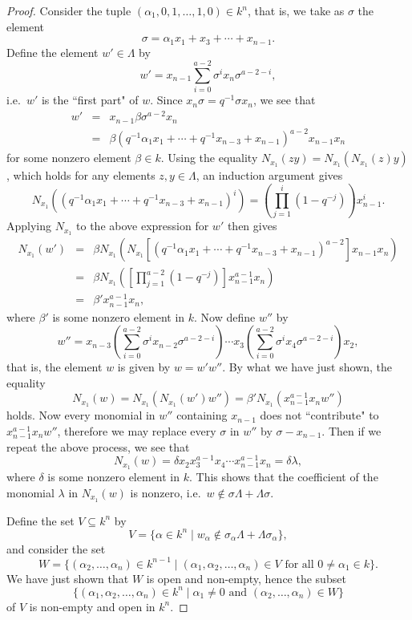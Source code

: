 \documentclass[a4paper]{amsart}
\theoremstyle{definition}
\theoremstyle{definition}
\theoremstyle{definition}
\theoremstyle{definition}
\theoremstyle{definition}
\theoremstyle{definition}
\theoremstyle{remark}
\theoremstyle{remark}
\theoremstyle{definition}
\theoremstyle{definition}
\begin{document}
\begin{proof}
Consider the tuple $( \alpha_1,0,1, \dots, 1,0) \in k^n$, that is,
we take as $\sigma$ the element
$$\sigma = \alpha_1x_1 + x_3 + \cdots + x_{n-1}.$$
Define the element $w' \in \Lambda$ by
$$w' = x_{n-1} \sum_{i=0}^{a-2} \sigma^i x_n \sigma^{a-2-i},$$
i.e.\ $w'$ is the ``first part" of $w$. Since $x_n \sigma = q^{-1}
\sigma x_n$, we see that
\begin{eqnarray*}
w' & = & x_{n-1} \beta \sigma^{a-2} x_n \\
& = & \beta ( q^{-1} \alpha_1x_1 + \cdots + q^{-1}x_{n-3} + x_{n-1}
)^{a-2}x_{n-1}x_n
\end{eqnarray*}
for some nonzero element $\beta \in k$. Using the equality
$N_{x_1}(zy) = N_{x_1} \left ( N_{x_1}(z)y \right )$, which holds
for any elements $z,y \in \Lambda$, an induction argument gives
$$N_{x_1} \left ( ( q^{-1} \alpha_1x_1 + \cdots + q^{-1}x_{n-3} + x_{n-1}
)^i \right ) = \left ( \prod_{j=1}^i (1-q^{-j}) \right )
x_{n-1}^i.$$ Applying $N_{x_1}$ to the above expression for $w'$
then gives
\begin{eqnarray*}
N_{x_1}( w' ) &=& \beta N_{x_1} \left ( N_{x_1} \left [ ( q^{-1}
\alpha_1x_1 + \cdots + q^{-1}x_{n-3} + x_{n-1} )^{a-2} \right ]
x_{n-1}x_n
\right ) \\
&=& \beta N_{x_1} \left ( \left [ \prod_{j=1}^{a-2} (1-q^{-j})
\right ] x_{n-1}^{a-1}x_n \right ) \\
&=& \beta' x_{n-1}^{a-1}x_n,
\end{eqnarray*}
where $\beta'$ is some nonzero element in $k$. Now define $w''$ by
$$w'' =x_{n-3} \left ( \sum_{i=0}^{a-2} \sigma^i x_{n-2}
\sigma^{a-2-i} \right ) \cdots x_3 \left ( \sum_{i=0}^{a-2} \sigma^i
x_4 \sigma^{a-2-i} \right ) x_2,$$ that is, the element $w$ is given
by $w=w'w''$. By what we have just shown, the equality
$$N_{x_1}(w) = N_{x_1} \left ( N_{x_1} (w')w'' \right )  = \beta' N_{x_1}
(x_{n-1}^{a-1}x_nw'')$$ holds. Now every monomial in $w''$
containing $x_{n-1}$ does not ``contribute" to
$x_{n-1}^{a-1}x_nw''$, therefore we may replace every $\sigma$ in
$w''$ by $\sigma - x_{n-1}$. Then if we repeat the above process, we
see that
$$N_{x_1}(w) = \delta x_2x_3^{a-1}x_4 \cdots
x_{n-1}^{a-1}x_n = \delta \lambda,$$ where $\delta$ is some nonzero
element in $k$. This shows that the coefficient of the monomial
$\lambda$ in $N_{x_1}(w)$ is nonzero, i.e.\ $w \notin \sigma \Lambda
+ \Lambda \sigma$.

Define the set $V \subseteq k^n$ by
$$V = \{ \alpha \in k^n \mid w_{\alpha} \notin \sigma_{\alpha}
\Lambda + \Lambda \sigma_{\alpha} \},$$ and consider the set
$$W = \{ ( \alpha_2, \dots, \alpha_n ) \in k^{n-1} \mid ( \alpha_1, \alpha_2,
\dots, \alpha_n) \in V \text{ for all } 0 \neq \alpha_1 \in k \}.$$
We have just shown that $W$ is open and non-empty, hence the subset
$$\{ ( \alpha_1, \alpha_2, \dots, \alpha_n) \in k^n \mid \alpha_1
\neq 0 \text{ and } ( \alpha_2, \dots, \alpha_n ) \in W \}$$ of $V$
is non-empty and open in $k^n$.


\end{proof}
\end{document}
